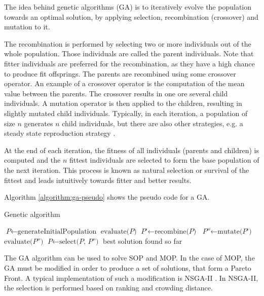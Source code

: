 The idea behind genetic algorithms (GA) is to iteratively evolve the population towards an optimal solution, by applying selection, recombination (crossover) and mutation to it.

The recombination is performed by selecting two or more individuals out of the whole population. Those individuals are called the parent individuals. Note that fitter individuals are preferred for the recombination, as they have a high chance to produce fit offsprings. The parents are recombined using some crossover operator. An example of a crossover operator is the computation of the mean value between the parents. The crossover results in one ore several child individuals. A mutation operator is then applied to the children, resulting in slightly mutated child individuals. Typically, in each iteration, a population of size $n$ generates $n$ child individuals, but there are also other strategies, e.g. a steady state reproduction strategy \cite{durillo2008study}.

At the end of each iteration, the fitness of all individuals (parents and children) is computed and the $n$ fittest individuals are selected to form the base population of the next iteration. This process is known as natural selection or survival of the fittest and leads intuitively towards fitter and better results. 

Algorithm \ref{algorithm:ga-pseudo} shows the pseudo code for a GA.

\begin{algorithm}
  \caption{Genetic algorithm}\label{algorithm:ga-pseudo}
  \begin{algorithmic}[1]
  \State $\textit{P} \gets \text{generateInitialPopulation}$
  \State $\text{evaluate(} \textit{P} \text{)}$
    \State $\textit{P'} \gets \text{recombine(} \textit{P} \text{)}$
    \State $\textit{P''} \gets \text{mutate(} \textit{P'} \text{)}$
    \State $\text{evaluate(} \textit{P''} \text{)}$
    \State $\textit{P} \gets \text{select(} \textit{P, P''} \text{)}$
  \EndWhile
  \Return best solution found so far
  \EndProcedure
  \end{algorithmic}
\end{algorithm}

The GA algorithm can be used to solve SOP and MOP. In the case of MOP, the GA must be modified in order to produce a set of solutions, that form a Pareto Front. A typical implementation of such a modification is NSGA-II \cite{deb2002fast}. In NSGA-II, the selection is performed based on ranking and crowding distance.

